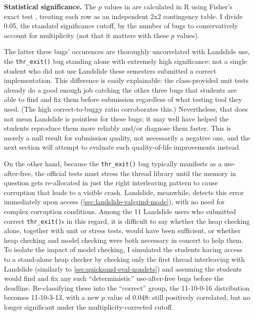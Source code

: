 {\bf Statistical significance.}
The $p$ values
in 
are calculated in R \cite{r-lang} using Fisher's exact test \cite{fishers-exact-test},
treating each row as an independent 2x2 contingency table.
I divide 0.05, the standard significance cutoff,
by the number of bugs to conservatively account for multiplicity \cite{xkcd-jellybeans}
(not that it matters with these $p$ values).

The latter three bugs' occurences are thoroughly uncorrelated with Landslide use,
the {\tt thr\_exit()} bug standing alone with extremely high significance:
not a single student who did not use Landslide these semesters
submitted a correct implementation.
This difference is easily explainable:
the class-provided unit tests already do a good enough job catching the other three bugs
that students are able to find and fix them before submission regardless of what testing tool they used.
(The high correct-to-buggy ratio corroborates this.)
Nevertheless, that does not mean Landslide is pointless for these bugs;
it may well have helped the students reproduce them more reliably and/or diagnose them faster.
This is merely a null result for submission quality, not necessarily a negative one,
and the next section will attempt to evaluate such quality-of-life improvements instead.

On the other hand, because the {\tt thr\_exit()} bug typically manifests as a use-after-free,
the official tests must stress the thread library until the memory in question gets re-allocated
in just the right interleaving pattern to cause corruption that leads to a visible crash.
Landslide, meanwhile, detects this error immediately upon access (\cref{sec:landslide-valgrind-mode}),
with no need for complex corruption conditions.
Among the 11 Landslide users who submitted correct {\tt thr\_exit()}s in this regard,
it is difficult to say whether the heap checking alone, together with unit or stress tests,
would have been sufficient,
or whether heap checking and model checking were both necessary in concert to help them.
To isolate the impact of model checking,
I simulated the students having access to a stand-alone heap checker
by checking only the first thread interleaving with Landslide
(similarly to \cref{sec:quicksand-eval-nondets})
and assuming the students would find and fix any such ``deterministic'' use-after-free bugs before the deadline.
Re-classifying these into the ``correct'' group,
the 11-10-0-16 distribution becomes
11-10-3-13,
with a new $p$ value of 0.048:
still positively correlated, but no longer significant under the multiplicity-corrected cutoff.

